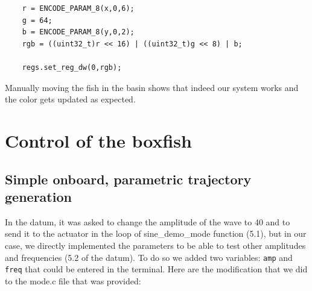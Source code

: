 \documentclass[11pt]{article}
\begin{document}
\begin{verbatim}
    r = ENCODE_PARAM_8(x,0,6);
    g = 64;
    b = ENCODE_PARAM_8(y,0,2);
    rgb = ((uint32_t)r << 16) | ((uint32_t)g << 8) | b; 

    regs.set_reg_dw(0,rgb);
\end{verbatim}
Manually moving the fish in the basin shows that indeed our system works and the color gets updated as expected.

\section{Control of the boxfish}

\subsection{Simple onboard, parametric trajectory generation}

In the datum, it was asked to change the amplitude of the wave to 40 and to send it to the actuator in the loop of sine\_demo\_mode function (5.1), but in our case, we directly implemented the parameters to be able to test other amplitudes and frequencies (5.2 of the datum). To do so we added two variables: \texttt{amp} and \texttt{freq} that could be entered in the terminal. Here are the modification that we did to the mode.c file that was provided:
\end{document}

